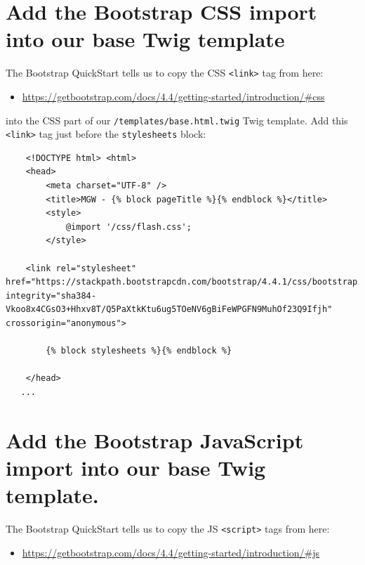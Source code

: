 \documentclass[a4paperpaper,openright]{book}
\providecommand{\tightlist}{%
  \setlength{\itemsep}{0pt}\setlength{\parskip}{0pt}}
\begin{document}
\hypertarget{add-the-bootstrap-css-import-into-our-base-twig-template}{%
\section{Add the Bootstrap CSS import into our base Twig
template}\label{add-the-bootstrap-css-import-into-our-base-twig-template}}

The Bootstrap QuickStart tells us to copy the CSS
\texttt{\textless{}link\textgreater{}} tag from here:

\begin{itemize}
\tightlist
\item
  \url{https://getbootstrap.com/docs/4.4/getting-started/introduction/\#css}
\end{itemize}

into the CSS part of our \texttt{/templates/base.html.twig} Twig
template. Add this \texttt{\textless{}link\textgreater{}} tag just
before the \texttt{stylesheets} block:

\begin{verbatim}
    <!DOCTYPE html> <html>
    <head>
        <meta charset="UTF-8" />
        <title>MGW - {% block pageTitle %}{% endblock %}</title>
        <style>
            @import '/css/flash.css';
        </style>

    <link rel="stylesheet" href="https://stackpath.bootstrapcdn.com/bootstrap/4.4.1/css/bootstrap.min.css" integrity="sha384-Vkoo8x4CGsO3+Hhxv8T/Q5PaXtkKtu6ug5TOeNV6gBiFeWPGFN9MuhOf23Q9Ifjh" crossorigin="anonymous">
        
        {% block stylesheets %}{% endblock %}
        
    </head>
   ...
\end{verbatim}

\hypertarget{add-the-bootstrap-javascript-import-into-our-base-twig-template.}{%
\section{Add the Bootstrap JavaScript import into our base Twig
template.}\label{add-the-bootstrap-javascript-import-into-our-base-twig-template.}}

The Bootstrap QuickStart tells us to copy the JS
\texttt{\textless{}script\textgreater{}} tags from here:

\begin{itemize}
\tightlist
\item
  \url{https://getbootstrap.com/docs/4.4/getting-started/introduction/\#js}
\end{itemize}
\end{document}
